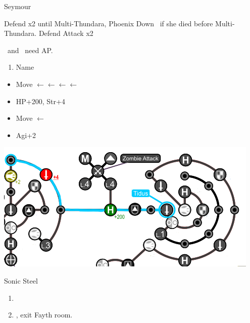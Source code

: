 \begin{battle}[6000]{Seymour}
	\begin{itemize}
		\tidusf Defend x2 until Multi-Thundara, Phoenix Down \rikku\ if she died before Multi-Thundara.
		\rikkuf Defend
		\tidusf Attack x2
	\end{itemize}
	\tidus\ and \yuna\ need AP.
\end{battle}
\begin{enumerate}[resume]
	\item Name \shiva
\end{enumerate}
\begin{spheregrid}
	\begin{itemize}
		\tidusf
		\begin{itemize}
			\item Move $\leftarrow\leftarrow\leftarrow\leftarrow$
			\item HP+200, Str+4
			\item Move $\leftarrow$
			\item Agi+2
		\end{itemize}
		\includegraphics[width=.8\columnwidth]{graphics/Tidus_Post_Seymour}
	\end{itemize}
\end{spheregrid}
\winvfill
\begin{equip}
	\begin{itemize}
		\tidusf Sonic Steel
	\end{itemize}
\end{equip}
\begin{enumerate}[resume]
	\item \formation{\rikku}{\tidus}{\yuna}
	\item \save, exit Fayth room.
\end{enumerate}
